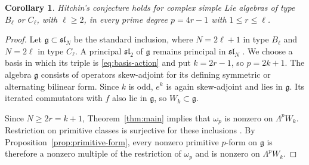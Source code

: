 \documentclass[12pt]{article}
\newtheorem{corollary}[theorem]{Corollary}
\theoremstyle{definition}
\theoremstyle{remark}
\begin{document}
\begin{samepage}
\begin{corollary}\label{cor:BC}
Hitchin's conjecture holds for complex simple Lie algebras of type
$B_\ell$ or $C_\ell$, with $\ell\geq2$, in every prime degree
$p=4r-1$ with $1\leq r\leq\ell$.
\end{corollary}

\begin{proof}
Let $\mathfrak g\subset\mathfrak{sl}_N$ be the standard inclusion, where
$N=2\ell+1$ in type $B_\ell$ and $N=2\ell$ in type $C_\ell$.
A principal $\mathfrak{sl}_2$ of $\mathfrak g$ remains principal in
$\mathfrak{sl}_N$ \cite[proof of Theorem 2.5]{BushekKumar2014}.
We choose a basis in which its triple is \eqref{eq:basis-action}
and put $k=2r-1$, so $p=2k+1$.
The algebra $\mathfrak g$ consists of operators
skew-adjoint for its defining symmetric or alternating bilinear form.
Since $k$ is odd, $e^k$ is again skew-adjoint and lies in
$\mathfrak g$. Its iterated commutators with $f$ also lie in
$\mathfrak g$, so $W_k\subset\mathfrak g$.

Since $N\geq2r=k+1$, Theorem~\ref{thm:main} implies that
$\omega_p$ is nonzero on $\Lambda^pW_k$.
Restriction on primitive classes is surjective for these inclusions
\cite[Theorem 3.5]{BushekKumar2014}.
By Proposition~\ref{prop:primitive-form}, every nonzero primitive
$p$-form on $\mathfrak g$ is therefore a nonzero multiple of the
restriction of $\omega_p$ and is nonzero on $\Lambda^pW_k$.
\end{proof}
\end{samepage}
\end{document}
